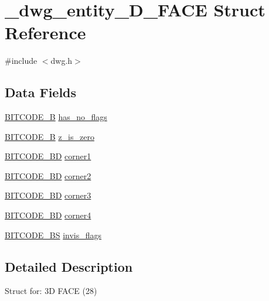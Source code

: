 \hypertarget{struct__dwg__entity__3D__FACE}{\section{\-\_\-dwg\-\_\-entity\-\_\-D\-\_\-\-F\-A\-C\-E \-Struct \-Reference}
\label{struct__dwg__entity__3D__FACE}
}


{\ttfamily \#include $<$dwg.\-h$>$}

\subsection*{\-Data \-Fields}
\begin{DoxyCompactItemize}
\item 
\hyperlink{dwg_8h_ab533b1f62d9086749e3bb5b67e9f224e}{\-B\-I\-T\-C\-O\-D\-E\-\_\-\-B} \hyperlink{struct__dwg__entity__3D__FACE_ae35c780d1d0c142cdc77cbc697fd7d74}{has\-\_\-no\-\_\-flags}
\item 
\hyperlink{dwg_8h_ab533b1f62d9086749e3bb5b67e9f224e}{\-B\-I\-T\-C\-O\-D\-E\-\_\-\-B} \hyperlink{struct__dwg__entity__3D__FACE_a75c7036228f066b3adddbacd8ddfe616}{z\-\_\-is\-\_\-zero}
\item 
\hyperlink{dwg_8h_a00698ef1bb072aa0a9360c6fc1c57587}{\-B\-I\-T\-C\-O\-D\-E\-\_\-B\-D} \hyperlink{struct__dwg__entity__3D__FACE_a8b4a74e04029eecdbd248b0b9897e0f9}{corner1}
\item 
\hyperlink{dwg_8h_a00698ef1bb072aa0a9360c6fc1c57587}{\-B\-I\-T\-C\-O\-D\-E\-\_\-B\-D} \hyperlink{struct__dwg__entity__3D__FACE_a4f2a443e525f4475df59d9d0dff34657}{corner2}
\item 
\hyperlink{dwg_8h_a00698ef1bb072aa0a9360c6fc1c57587}{\-B\-I\-T\-C\-O\-D\-E\-\_\-B\-D} \hyperlink{struct__dwg__entity__3D__FACE_a865e3097dc454c5e21581637d6376503}{corner3}
\item 
\hyperlink{dwg_8h_a00698ef1bb072aa0a9360c6fc1c57587}{\-B\-I\-T\-C\-O\-D\-E\-\_\-B\-D} \hyperlink{struct__dwg__entity__3D__FACE_a852a7937eee59a5935818dbd5fab2d46}{corner4}
\item 
\hyperlink{dwg_8h_a94297606fbd4a4ff97e8add284af0809}{\-B\-I\-T\-C\-O\-D\-E\-\_\-\-B\-S} \hyperlink{struct__dwg__entity__3D__FACE_a73061a4a0be907c7966cfae3a0ad080a}{invis\-\_\-flags}
\end{DoxyCompactItemize}


\subsection{\-Detailed \-Description}
\-Struct for\-: 3\-D \-F\-A\-C\-E (28) 

